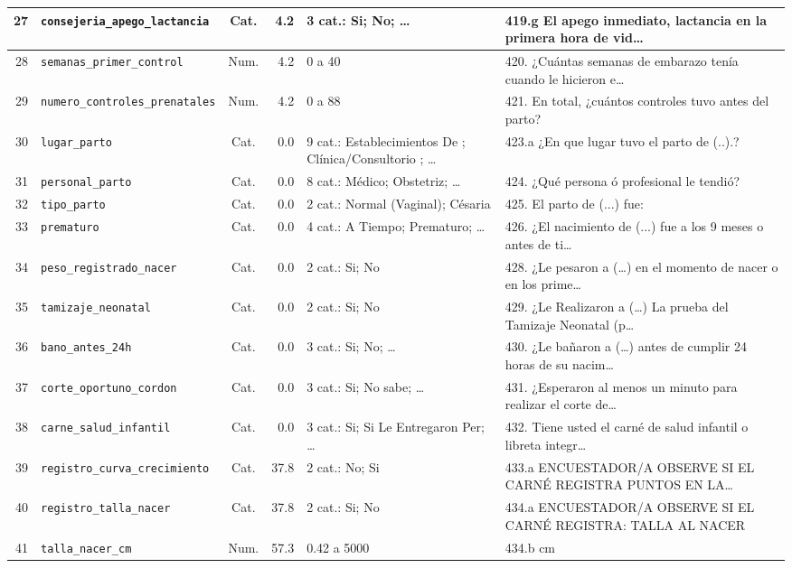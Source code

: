 \begin{longtable}{|r|p{3.1cm}|c|r|p{3.0cm}|p{3.8cm}|}
  27 & \texttt{consejeria\_apego\_lactancia} & Cat. & 4.2 & 3 cat.: Si; No; … & 419.g El apego inmediato, lactancia en la primera hora de vid… \\ \hline
  28 & \texttt{semanas\_primer\_control} & Num. & 4.2 & 0 a 40 & 420.  ¿Cuántas semanas de embarazo tenía cuando le hicieron e… \\ \hline
  29 & \texttt{numero\_controles\_prenatales} & Num. & 4.2 & 0 a 88 & 421.  En total, ¿cuántos controles tuvo antes del parto? \\ \hline
  30 & \texttt{lugar\_parto} & Cat. & 0.0 & 9 cat.: Establecimientos De ; Clínica/Consultorio ; … & 423.a ¿En que lugar tuvo el parto de (..).? \\ \hline
  31 & \texttt{personal\_parto} & Cat. & 0.0 & 8 cat.: Médico; Obstetriz; … & 424.  ¿Qué persona ó profesional le tendió? \\ \hline
  32 & \texttt{tipo\_parto} & Cat. & 0.0 & 2 cat.: Normal (Vaginal); Césaria & 425.  El parto de (...) fue: \\ \hline
  33 & \texttt{prematuro} & Cat. & 0.0 & 4 cat.: A Tiempo; Prematuro; … & 426.  ¿El nacimiento de (...) fue a los 9 meses o antes de ti… \\ \hline
  34 & \texttt{peso\_registrado\_nacer} & Cat. & 0.0 & 2 cat.: Si; No & 428.  ¿Le pesaron a (…) en el momento de nacer o en los prime… \\ \hline
  35 & \texttt{tamizaje\_neonatal} & Cat. & 0.0 & 2 cat.: Si; No & 429.  ¿Le Realizaron a (…) La prueba del Tamizaje Neonatal (p… \\ \hline
  36 & \texttt{bano\_antes\_24h} & Cat. & 0.0 & 3 cat.: Si; No; … & 430.  ¿Le bañaron a (…) antes de cumplir 24 horas de su nacim… \\ \hline
  37 & \texttt{corte\_oportuno\_cordon} & Cat. & 0.0 & 3 cat.: Si; No sabe; … & 431.  ¿Esperaron al menos un minuto para realizar el corte de… \\ \hline
  38 & \texttt{carne\_salud\_infantil} & Cat. & 0.0 & 3 cat.: Si; Si Le Entregaron Per; … & 432.  Tiene usted el carné de salud infantil o libreta integr… \\ \hline
  39 & \texttt{registro\_curva\_crecimiento} & Cat. & 37.8 & 2 cat.: No; Si & 433.a ENCUESTADOR/A OBSERVE SI EL CARNÉ REGISTRA PUNTOS EN LA… \\ \hline
  40 & \texttt{registro\_talla\_nacer} & Cat. & 37.8 & 2 cat.: Si; No & 434.a ENCUESTADOR/A OBSERVE SI EL CARNÉ REGISTRA: TALLA AL NACER \\ \hline
  41 & \texttt{talla\_nacer\_cm} & Num. & 57.3 & 0.42 a 5000 & 434.b cm \\ \hline

\end{longtable}
